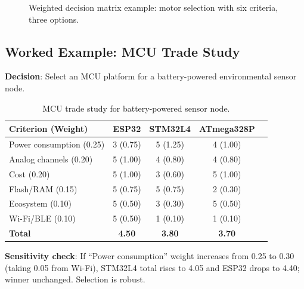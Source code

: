 \begin{figure}[htbp]\centering

\caption{Weighted decision matrix example: motor selection with six criteria, three options.}\label{fig:matrix}
\end{figure}


\subsection{Worked Example: MCU Trade Study}
\textbf{Decision}: Select an MCU platform for a battery-powered environmental sensor node.

\begin{table}[htbp]\centering\small
\begin{tabularx}{\textwidth}{l c c c c}
\toprule
\textbf{Criterion (Weight)} & \textbf{ESP32\index{ESP32}} & \textbf{STM32L4} & \textbf{ATmega328P} \\
\midrule
Power consumption (0.25) & 3 (0.75) & 5 (1.25) & 4 (1.00) \\
Analog channels (0.20) & 5 (1.00) & 4 (0.80) & 4 (0.80) \\
Cost (0.20) & 5 (1.00) & 3 (0.60) & 5 (1.00) \\
Flash/RAM (0.15) & 5 (0.75) & 5 (0.75) & 2 (0.30) \\
Ecosystem (0.10) & 5 (0.50) & 3 (0.30) & 5 (0.50) \\
Wi-Fi/BLE (0.10) & 5 (0.50) & 1 (0.10) & 1 (0.10) \\
\midrule
\textbf{Total} & \textbf{4.50} & \textbf{3.80} & \textbf{3.70} \\
\bottomrule
\end{tabularx}
\caption{MCU trade study for battery-powered sensor node.}
\end{table}

\textbf{Sensitivity check}: If ``Power consumption'' weight increases from 0.25 to 0.30 (taking 0.05 from Wi-Fi), STM32L4 total rises to 4.05 and ESP32 drops to 4.40; winner unchanged. Selection is robust.

